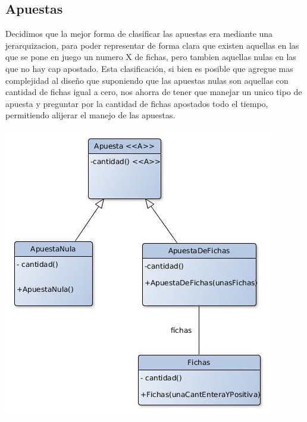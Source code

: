 \subsection{Apuestas}
Decidimos que la mejor forma de clasificar las apuestas era mediante una jerarquizacion, para poder representar de forma clara que existen aquellas en las que se pone en juego un numero X de fichas, pero tambien aquellas nulas en las que no hay cap apostado. Esta clasificación, si bien es posible que agregue mas complejidad al diseño que suponiendo que las apuestas nulas son aquellas con cantidad de fichas igual a cero, nos ahorra de tener que manejar un unico tipo de apuesta y preguntar por la cantidad de fichas apostados todo el tiempo, permitiendo alijerar el manejo de las apuestas.
\begin{center}
\includegraphics[scale=0.4]{diseno/apuestas.jpg}
\end{center}

